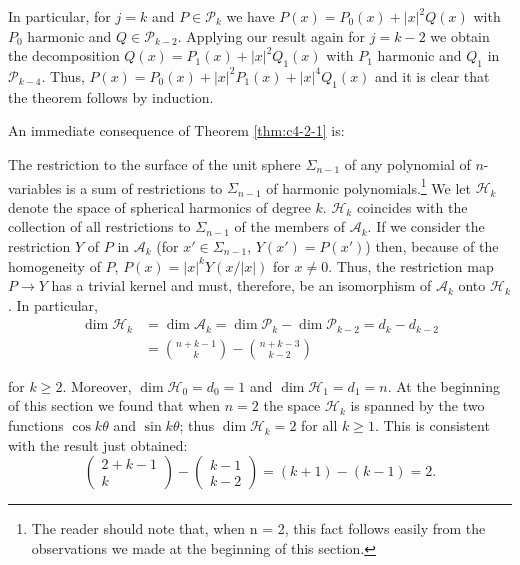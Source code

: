 In particular, for $j = k$ and $P \in \mathcal{P}_k$ we have $P(x) = P_0(x) + |x|^2 Q(x)$ with $P_0$ harmonic and $Q \in \mathcal{P}_{k-2}$. Applying our result again for $j = k - 2$ we obtain the decomposition $Q(x) = P_1(x) + |x|^2 Q_1(x)$ with $P_1$ harmonic and $Q_1$ in $\mathcal{P}_{k-4}$. Thus, $P(x) = P_0(x) + |x|^2 P_1(x) + |x|^4 Q_1(x)$ and it is clear that the theorem follows by induction.

An immediate consequence of Theorem \ref{thm:c4-2-1} is:

\begin{corollary}
\label{cor:c4-2-2}
The restriction to the surface of the unit sphere $\Sigma_{n-1}$ of any polynomial of $n$-variables is a sum of restrictions to $\Sigma_{n-1}$ of harmonic polynomials.\footnote{The reader should note that, when n = 2, this fact follows easily from the observations we made at the beginning of this section.}
We let $\mathcal{H}_k$ denote the space of spherical harmonics of degree $k$. $\mathcal{H}_k$ coincides with the collection of all restrictions to $\Sigma_{n-1}$ of the members of $\mathcal{A}_k$. If we consider the restriction $Y$ of $P$ in $\mathcal{A}_k$ (for $x' \in \Sigma_{n-1}$, $Y(x') = P(x')$) then, because of the homogeneity of $P$, $P(x) = |x|^k Y(x/|x|)$ for $x \neq 0$. Thus, the restriction map $P \to Y$ has a trivial kernel and must, therefore, be an isomorphism of $\mathcal{A}_k$ onto $\mathcal{H}_k$. In particular,
\[
\begin{aligned}\dim\mathcal{H}_{k}&=\dim\mathcal{A}_{k}=\dim\mathcal{P}_{k}-\dim\mathcal{P}_{k-2}=d_{k}-d_{k-2}\\&=\binom{n+k-1}{k}-\binom{n+k-3}{k-2}\end{aligned}
\]

for $k \geq 2$. Moreover, $\dim \mathcal{H}_0 = d_0 = 1$ and $\dim \mathcal{H}_1 = d_1 = n$. At the beginning of this section we found that when $n = 2$ the space $\mathcal{H}_k$ is spanned by the two functions $\cos k\theta$ and $\sin k\theta$; thus $\dim \mathcal{H}_k = 2$ for all $k \geq 1$. This is consistent with the result just obtained:
\[
\begin{pmatrix}2+k-1\\k\end{pmatrix}-\begin{pmatrix}k-1\\k-2\end{pmatrix}=(k+1)-(k-1)=2.
\]

\end{corollary}

